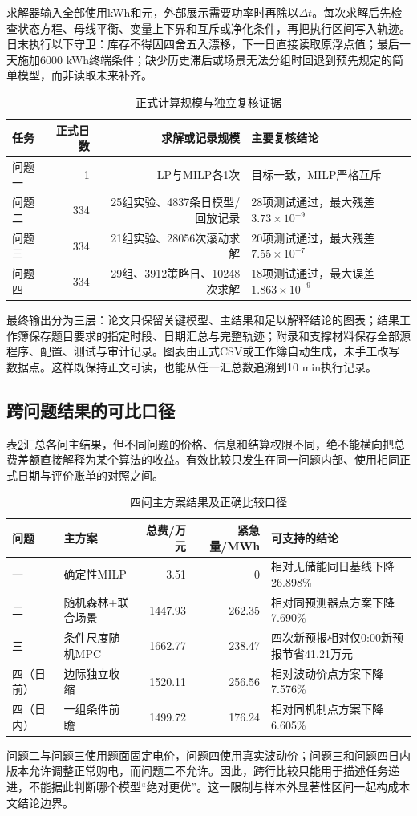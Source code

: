 求解器输入全部使用kWh和元，外部展示需要功率时再除以$\Delta t$。每次求解后先检查状态方程、母线平衡、变量上下界和互斥或净化条件，再把执行区间写入轨迹。日末执行以下守卫：库存不得因四舍五入漂移，下一日直接读取原浮点值；最后一天施加6000 kWh终端条件；缺少历史滞后或场景无法分组时回退到预先规定的简单模型，而非读取未来补齐。

\begin{table}[H]
\centering
\caption{正式计算规模与独立复核证据}
\label{tab:computation-audit}
\begin{tabularx}{\textwidth}{p{2.1cm}rrX}
\toprule
任务 & 正式日数 & 求解或记录规模 & 主要复核结论\\
\midrule
问题一 & 1 & LP与MILP各1次 & 目标一致，MILP严格互斥\\
问题二 & 334 & 25组实验、4837条日模型/回放记录 & 28项测试通过，最大残差$3.73\times10^{-9}$\\
问题三 & 334 & 21组实验、28056次滚动求解 & 20项测试通过，最大残差$7.55\times10^{-7}$\\
问题四 & 334 & 29组、3912策略日、10248次求解 & 18项测试通过，最大误差$1.863\times10^{-9}$\\
\bottomrule
\end{tabularx}
\end{table}

最终输出分为三层：论文只保留关键模型、主结果和足以解释结论的图表；结果工作簿保存题目要求的指定时段、日期汇总与完整轨迹；附录和支撑材料保存全部源程序、配置、测试与审计记录。图表由正式CSV或工作簿自动生成，未手工改写数据点。这样既保持正文可读，也能从任一汇总数追溯到10 min执行记录。

\subsection{跨问题结果的可比口径}

表\ref{tab:cross-question}汇总各问主结果，但不同问题的价格、信息和结算权限不同，绝不能横向把总费差额直接解释为某个算法的收益。有效比较只发生在同一问题内部、使用相同正式日期与评价账单的对照之间。

\begin{table}[H]
\centering
\caption{四问主方案结果及正确比较口径}
\label{tab:cross-question}
\begin{tabularx}{\textwidth}{p{1.3cm}p{3.2cm}rrX}
\toprule
问题 & 主方案 & 总费/万元 & 紧急量/MWh & 可支持的结论\\
\midrule
一 & 确定性MILP & 3.51 & 0 & 相对无储能同日基线下降26.898\%\\
二 & 随机森林+联合场景 & 1447.93 & 262.35 & 相对同预测器点方案下降7.690\%\\
三 & 条件尺度随机MPC & 1662.77 & 238.47 & 四次新预报相对仅0:00新预报节省41.21万元\\
四（日前） & 边际独立收缩 & 1520.11 & 256.56 & 相对波动价点方案下降7.576\%\\
四（日内） & 一组条件前瞻 & 1499.72 & 176.24 & 相对同机制点方案下降6.605\%\\
\bottomrule
\end{tabularx}
\end{table}

问题二与问题三使用题面固定电价，问题四使用真实波动价；问题三和问题四日内版本允许调整正常购电，而问题二不允许。因此，跨行比较只能用于描述任务递进，不能据此判断哪个模型“绝对更优”。这一限制与样本外显著性区间一起构成本文结论边界。
